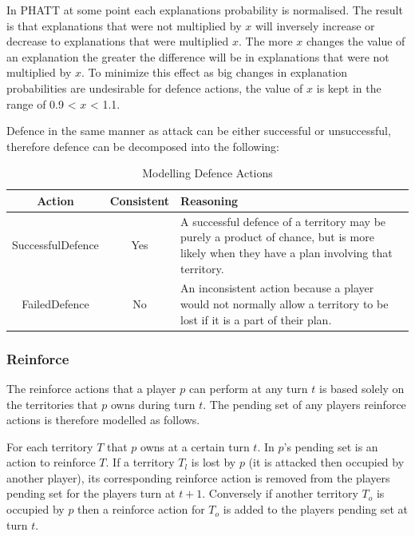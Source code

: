 \documentclass[parskip]{cs4rep}
\begin{document}
In PHATT at some point each explanations probability is normalised. The result is that explanations that were not multiplied by $x$ will inversely increase or decrease to explanations that were multiplied $x$. The more $x$ changes the value of an explanation the greater the difference will be in explanations that were not multiplied by $x$. To minimize this effect as big changes in explanation probabilities are undesirable for defence actions, the value of $x$ is kept in the range of 0.9 < $x$ < 1.1.

Defence in the same manner as attack can be either successful or unsuccessful, therefore defence can be decomposed into the following: 

\begin{table}[ht]
\centering
\begin{tabular}{|c|c|p{8cm}|}
\hline 
\textbf{Action} & \textbf{Consistent}  & \textbf{Reasoning} \\ 
\hline 
SuccessfulDefence & Yes & A successful defence of a territory may be purely a product of chance, but is more likely when they have a plan involving that territory. \\ 
\hline 
FailedDefence & No & An inconsistent action because a player would not normally allow a territory to be lost if it is a part of their plan. \\ 
\hline
\end{tabular}
\caption{Modelling Defence Actions}
\label{table:attack-defend-modelling}
\end{table}

\newpage

\subsubsection{Reinforce}

The reinforce actions that a player $p$ can perform at any turn $t$ is based solely on the territories that $p$ owns during turn $t$. The pending set of any players reinforce actions is therefore modelled as follows. 

For each territory $T$ that $p$ owns at a certain turn $t$. In $p$'s pending set is an action to reinforce $T$. If a territory $T_{l}$ is lost by $p$ (it is attacked then occupied by another player), its corresponding reinforce action is removed from the players pending set for the players turn at $t+1$. Conversely if another territory $T_{o}$ is occupied by $p$ then a reinforce action for $T_{o}$ is added to the players pending set at turn $t$.
\end{document}
